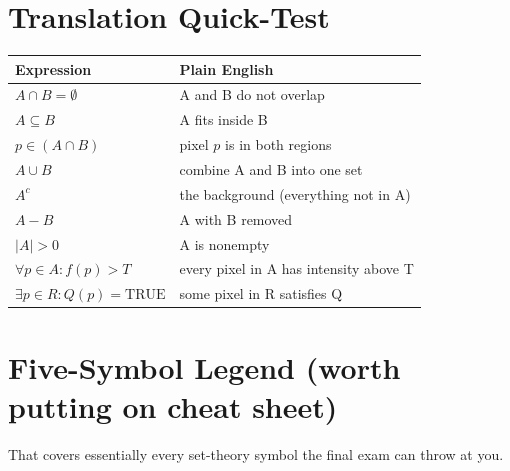 \documentclass[11pt]{article}
\begin{document}
\section{Translation Quick-Test}

\begin{tcolorbox}[refbox]
\begin{tabular}{@{}ll@{}}
\toprule
\textbf{Expression} & \textbf{Plain English} \\
\midrule
$A \cap B = \emptyset$ & A and B do not overlap \\
$A \subseteq B$ & A fits inside B \\
$p \in (A \cap B)$ & pixel $p$ is in both regions \\
$A \cup B$ & combine A and B into one set \\
$A^c$ & the background (everything not in A) \\
$A - B$ & A with B removed \\
$|A| > 0$ & A is nonempty \\
$\forall p \in A : f(p) > T$ & every pixel in A has intensity above T \\
$\exists p \in R : Q(p) = \text{TRUE}$ & some pixel in R satisfies Q \\
\bottomrule
\end{tabular}
\end{tcolorbox}

\section{Five-Symbol Legend (worth putting on cheat sheet)}

\begin{center}
\end{center}

That covers essentially every set-theory symbol the final exam can throw at you.
\end{document}
